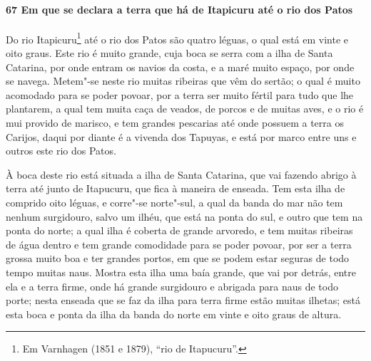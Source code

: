 \begin{linenumbers}
\paragraph{67 Em que se declara a terra que há de Itapicuru até o rio dos Patos} \quad
Do rio Itapicuru\footnote{ Em Varnhagen (1851 e 1879), ``rio de Itapucuru''.} até o rio
dos Patos são quatro léguas, o qual está em vinte e oito graus. Este rio é muito grande,
cuja boca se serra com a ilha de Santa Catarina, por onde entram os navios da costa, e a
maré muito espaço, por onde se navega. Metem"-se neste rio muitas ribeiras que vêm do
sertão; o qual é muito acomodado para se poder povoar, por a terra ser muito fértil para
tudo que lhe plantarem, a qual tem muita caça de veados, de porcos e de muitas aves, e o
rio é mui provido de marisco, e tem grandes pescarias até onde possuem a terra os Carijos,
daqui por diante é a vivenda dos Tapuyas, e está por marco entre uns e outros este rio dos
Patos.

À boca deste rio está situada a ilha de Santa Catarina, que vai fazendo abrigo à terra até
junto de Itapucuru, que fica à maneira de enseada. Tem esta ilha de comprido oito léguas,
e corre"-se norte"-sul, a qual da banda do mar não tem nenhum surgidouro, salvo um ilhéu,
que está na ponta do sul, e outro que tem na ponta do norte; a qual ilha é coberta de
grande arvoredo, e tem muitas ribeiras de água dentro e tem grande comodidade para se
poder povoar, por ser a terra grossa muito boa e ter grandes portos, em que se podem estar
seguras de todo tempo muitas naus. Mostra esta ilha uma baía grande, que vai por detrás,
entre ela e a terra firme, onde há grande surgidouro e abrigada para naus de todo porte;
nesta enseada que se faz da ilha para terra firme estão muitas ilhetas; está esta boca e
ponta da ilha da banda do norte em vinte e oito graus de altura.


\end{linenumbers}
